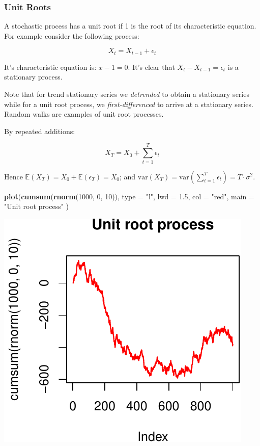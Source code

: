 \documentclass[11pt,]{article}
\newenvironment{Shaded}{\begin{snugshade}}{\end{snugshade}}
\newcommand{\KeywordTok}[1]{\textcolor[rgb]{0.13,0.29,0.53}{\textbf{#1}}}
\newcommand{\DataTypeTok}[1]{\textcolor[rgb]{0.13,0.29,0.53}{#1}}
\newcommand{\DecValTok}[1]{\textcolor[rgb]{0.00,0.00,0.81}{#1}}
\newcommand{\FloatTok}[1]{\textcolor[rgb]{0.00,0.00,0.81}{#1}}
\newcommand{\StringTok}[1]{\textcolor[rgb]{0.31,0.60,0.02}{#1}}
\newcommand{\NormalTok}[1]{#1}
\begin{document}
\subsubsection{Unit Roots}\label{unit-roots}

A stochastic process has a unit root if 1 is the root of its
characteristic equation. For example consider the following process:

\[X_t = X_{t-1} + \epsilon_t\]

It's characteristic equation is: \(x - 1 = 0\). It's clear that
\(X_t - X_{t-1} = \epsilon_t\) is a stationary process.

Note that for trend stationary series we \emph{detrended} to obtain a
stationary series while for a unit root process, we
\emph{first-differenced} to arrive at a stationary series. Random walks
are examples of unit root processes.

By repeated additions:

\[X_T = X_0 + \sum_{t = 1}^T \epsilon_t\]

Hence \(\mathbb{E}(X_T) = X_0 + \mathbb{E}(\epsilon_T) = X_0\); and
\(\text{var}(X_T) = \text{var}(\sum_{t = 1}^T \epsilon_t) = T\cdot \sigma^2\).

\begin{Shaded}
\begin{Highlighting}[]
\KeywordTok{plot}\NormalTok{(}\KeywordTok{cumsum}\NormalTok{(}\KeywordTok{rnorm}\NormalTok{(}\DecValTok{1000}\NormalTok{, }\DecValTok{0}\NormalTok{, }\DecValTok{10}\NormalTok{)),}
     \DataTypeTok{type =} \StringTok{"l"}\NormalTok{,}
     \DataTypeTok{lwd =} \FloatTok{1.5}\NormalTok{,}
     \DataTypeTok{col =} \StringTok{"red"}\NormalTok{,}
     \DataTypeTok{main =} \StringTok{"Unit root process"}
\NormalTok{     )}
\end{Highlighting}
\end{Shaded}

\begin{center}\includegraphics{FMC_T4_PhD_Fin_Time_Series_files/figure-latex/unit_root-1} \end{center}
\end{document}
